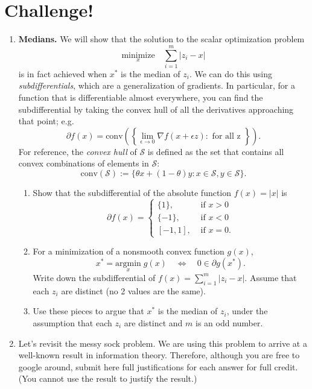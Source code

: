 \documentclass{article}
\newcommand{\minimize}[1]{\underset{#1}{\text{minimize}}}
\newcommand{\argmin}[1]{\underset{#1}{\text{argmin}}}
\newcommand{\mS}{\mathcal S}
\begin{document}
\section*{Challenge!}
\begin{enumerate}






\item \textbf{Medians.} We will show that the solution to the scalar optimization problem
\[
\minimize{x} \quad \sum_{i=1}^m |z_i-x|
\]
is in fact achieved when $x^*$ is the median of $z_i$. We can do this using \emph{subdifferentials}, which are a generalization of gradients. In particular, for a function that is differentiable almost everywhere, you can find the subdifferential by taking the convex hull of all the derivatives approaching that point; e.g.
\[
\partial f(x) = \mathrm{conv}\left(\left\{\lim_{\epsilon\to 0} \nabla f(x+\epsilon z) : \text{ for all z } \right\}\right).
\]
For reference, the \emph{convex hull} of $\mS$ is defined as the set that contains all convex combinations of elements in $\mS$:
\[
\mathrm{conv}(\mS) := \{\theta x + (1-\theta) y : x\in \mS, y\in \mS\}.
\]


\begin{enumerate}
\item Show that the subdifferential of the absolute function $f(x) = |x|$ is 
\[
\partial f(x) = \begin{cases}
\{1\}, & \text{ if } x > 0\\
\{-1\}, & \text{ if } x < 0\\
[-1,1], & \text{ if } x = 0.
\end{cases}
\]



\item For a minimization of a nonsmooth convex function $g(x)$, 
\[
x^* = \argmin{x}\; g(x) \quad \iff \quad 0 \in \partial g(x^*).
\]
Write down the subdifferential of  $f(x) = \sum_{i=1}^m |z_i-x|$. Assume that each $z_i$ are distinct (no 2 values are the same). 



\item Use these pieces to argue that $x^*$ is the median of $z_i$, under the assumption that each $z_i$ are distinct and $m$ is an odd number.


\end{enumerate}




\item Let's revisit the messy sock problem. We are using this problem to arrive at a well-known result in information theory. Therefore, although you are free to google around, submit here full justifications for each answer for full credit. (You cannot use the result to justify the result.)


\end{enumerate}
\end{document}
